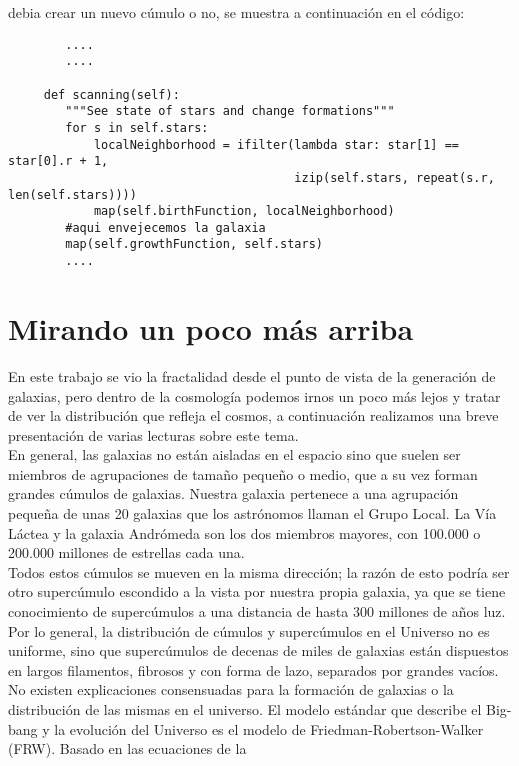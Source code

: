 \documentclass[12tp]{article}
\begin{document}
debia crear un nuevo cúmulo o no, se muestra a continuación en el código:
\begin{small}
    \begin{verbatim}
        ....
        ....
        
     def scanning(self):
        """See state of stars and change formations"""
        for s in self.stars:
            localNeighborhood = ifilter(lambda star: star[1] == star[0].r + 1,
                                        izip(self.stars, repeat(s.r, len(self.stars))))
            map(self.birthFunction, localNeighborhood)
        #aqui envejecemos la galaxia
        map(self.growthFunction, self.stars)
        ....
    \end{verbatim}
\end{small}

\appendix
\section{Mirando un poco más arriba}
En este trabajo se vio la fractalidad desde el punto de vista de la generación de galaxias, pero dentro de la cosmología podemos
irnos un poco más lejos y tratar de ver la distribución que refleja el cosmos, a continuación realizamos una breve presentación de 
varias lecturas sobre este tema.\\[0.2cm]
En general, las galaxias no están aisladas en el espacio sino que suelen ser miembros de agrupaciones de tamaño pequeño o medio, que 
a su vez forman grandes cúmulos de galaxias. Nuestra galaxia pertenece a una agrupación pequeña de unas 20 galaxias que los astrónomos 
llaman el Grupo Local. La Vía Láctea y la galaxia Andrómeda son los dos miembros mayores, con 100.000 o 200.000 millones de estrellas 
cada una.\\[0.2cm]
Todos estos cúmulos se mueven en la misma dirección; la razón de esto podría ser otro supercúmulo escondido a la vista por nuestra propia 
galaxia, ya que se tiene conocimiento de supercúmulos a una distancia de hasta 300 millones de años luz. 
Por lo general, la distribución de cúmulos y supercúmulos en el Universo no es uniforme, sino que supercúmulos de decenas de miles 
de galaxias están dispuestos en largos filamentos, fibrosos y con forma de lazo, separados por grandes vacíos.\\[0.2cm]
No existen explicaciones consensuadas para la formación de galaxias o la distribución de las mismas en el universo. El modelo estándar 
que describe el Big-bang y la evolución del Universo es el modelo de Friedman-Robertson-Walker (FRW). Basado en las ecuaciones de la 
\end{document}
